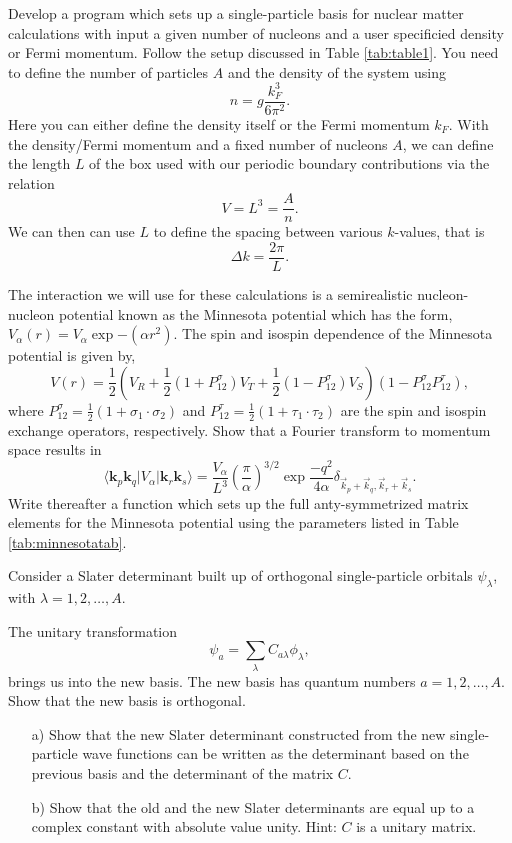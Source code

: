 \begin{prob}\label{problem:spbasissetup}
Develop a program which sets up a single-particle basis
for nuclear matter calculations with input a given number of nucleons and a user specificied 
density or Fermi momentum. Follow the setup discussed in Table \ref{tab:table1}. 
You need to define the number of particles $A$
and the density of the system using 
\[
n = g \frac{k_F^3}{6\pi^2}.
\]
Here you can either define the density itself or the Fermi momentum $k_F$.
With the density/Fermi momentum and a fixed number of nucleons $A$,
we can define the length $L$ of the box used with our periodic
boundary contributions via the relation
\[
  V= L^3= \frac{A}{n}.
\]
We can then  can use $L$ to define the spacing between
various $k$-values, that is
\[
  \Delta k = \frac{2\pi}{L}.
\]
\end{prob}


\begin{prob}\label{problem:fourier}
The interaction we will use for these calculations is a semirealistic nucleon-nucleon potential known as the Minnesota potential \cite{minnesota} which has the form, $V_{\alpha}\left( r\right)=V_{\alpha}\exp{-(\alpha r^{2})}$. The spin and isospin dependence of the Minnesota potential is given by,
\[
V\left( r\right)=\frac{1}{2}\left( V_{R}+\frac{1}{2}\left( 1+P_{12}^{\sigma}\right) V_{T}+\frac{1}{2}\left( 1-P_{12}^{\sigma}\right) V_{S}\right)\left( 1-P_{12}^{\sigma}P_{12}^{\tau}\right),
\]
where $P_{12}^{\sigma}=\frac{1}{2}\left( 1+\sigma_{1}\cdot\sigma_{2}\right)$ and $P_{12}^{\tau}=\frac{1}{2}\left( 1+\tau_{1}\cdot\tau_{2}\right)$ are the spin and isospin exchange operators, respectively. 
Show that a Fourier transform to momentum space results in 
\[
\langle \mathbf{k}_p \mathbf{k}_q \vert V_{\alpha}\vert \mathbf{k}_r\mathbf{k}_s\rangle=\frac{V_{\alpha}}{L^{3}}\left(\frac{\pi}{\alpha}\right)^{3/2}\exp{\frac{-q^{2}}{4\alpha}}\delta_{\vec{k}_{p}+\vec{k}_{q},\vec{k}_{r}+\vec{k}_{s}}.
\]
Write thereafter a function which sets up the full anty-symmetrized matrix elements for the Minnesota potential using the parameters 
listed in Table \ref{tab:minnesotatab}. 
\end{prob}



\begin{prob}
Consider a Slater determinant built up of orthogonal single-particle orbitals $\psi_{\lambda}$, 
with $\lambda = 1,2,\dots,A$.

The unitary transformation
\[
\psi_a  = \sum_{\lambda} C_{a\lambda}\phi_{\lambda},
\]
brings us into the new basis.  
The new basis has quantum numbers $a=1,2,\dots,A$.
Show that the new basis is orthogonal.
\begin{enumerate}
\item[a)] Show that the new Slater determinant constructed from the new single-particle wave functions can be
written as the determinant based on the previous basis and the determinant of the matrix $C$.
\item[b)]
Show that the old and the new Slater determinants are equal up to a complex constant with absolute value unity.
Hint: $C$ is a unitary matrix. 
\end{enumerate}
\end{prob}

